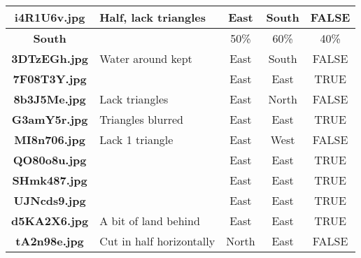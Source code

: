\documentclass{article}
\begin{document}
\begin{table}[h!]
{\begin{tabular}{|c|p{4cm}|c|c|c|}
            \textbf{i4R1U6v.jpg} & Half, lack triangles         & East                          & South                            & FALSE                \\ \hline
            \rowcolor{gray!40}
            \textbf{South}       &                              & 50\%                          & 60\%                             & 40\%                 \\ \hline
            \rowcolor{gray!0}
            \textbf{3DTzEGh.jpg} & Water around kept            & East                          & South                            & FALSE                \\ \hline
            \rowcolor{gray!10}
            \textbf{7F08T3Y.jpg} &                              & East                          & East                             & TRUE                 \\ \hline
            \rowcolor{gray!0}
            \textbf{8b3J5Me.jpg} & Lack triangles               & East                          & North                            & FALSE                \\ \hline
            \rowcolor{gray!10}
            \textbf{G3amY5r.jpg} & Triangles blurred            & East                          & East                             & TRUE                 \\ \hline
            \rowcolor{gray!0}
            \textbf{MI8n706.jpg} & Lack 1 triangle              & East                          & West                             & FALSE                \\ \hline
            \rowcolor{gray!10}
            \textbf{QO80o8u.jpg} &                              & East                          & East                             & TRUE                 \\ \hline
            \rowcolor{gray!0}
            \textbf{SHmk487.jpg} &                              & East                          & East                             & TRUE                 \\ \hline
            \rowcolor{gray!10}
            \textbf{UJNcds9.jpg} &                              & East                          & East                             & TRUE                 \\ \hline
            \rowcolor{gray!0}
            \textbf{d5KA2X6.jpg} & A bit of land behind         & East                          & East                             & TRUE                 \\ \hline
            \rowcolor{gray!10}
            \textbf{tA2n98e.jpg} & Cut in half horizontally     & North                         & East                             & FALSE                \\ \hline

\end{tabular}}
\end{table}
\end{document}
